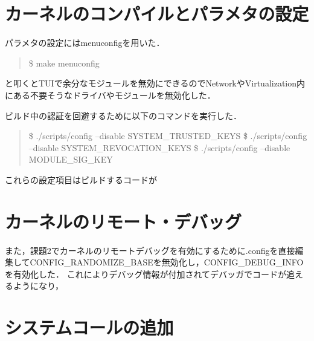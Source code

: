 \documentclass[12pt,a4paper,dvipdfmx]{jsreport}
\begin{document}


\chapter{カーネルのコンパイルとパラメタの設定}
パラメタの設定にはmenuconfigを用いた．
\begin{quote}
\$ make menuconfig
\end{quote}
と叩くとTUIで余分なモジュールを無効にできるのでNetworkやVirtualization内にある不要そうなドライバやモジュールを無効化した．


ビルド中の認証を回避するために以下のコマンドを実行した．
\begin{quote}
\$ ./scripts/config --disable SYSTEM_TRUSTED_KEYS
\$ ./scripts/config --disable SYSTEM_REVOCATION_KEYS
\$ ./scripts/config --disable MODULE_SIG_KEY
\end{quote}
これらの設定項目はビルドするコードが



\chapter{カーネルのリモート・デバッグ}
また，課題2でカーネルのリモートデバッグを有効にするために.configを直接編集してCONFIG_RANDOMIZE_BASEを無効化し，CONFIG_DEBUG_INFOを有効化した．
これによりデバッグ情報が付加されてデバッガでコードが追えるようになり，

\chapter{システムコールの追加}
\end{document}
